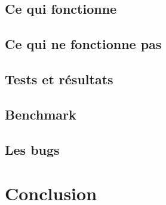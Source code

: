 \documentclass[12pt]{article}
\begin{document}
\subsection{Ce qui fonctionne}

\subsection{Ce qui ne fonctionne pas}

\subsection{Tests et résultats}

\subsection{Benchmark}

\subsection{Les bugs}

\section{Conclusion}
\printglossaries
\printbibliography
\end{document}
